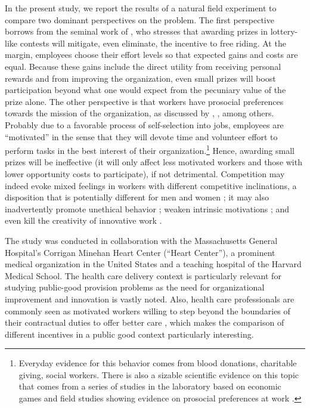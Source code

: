 \documentclass[11pt, titlepage]{article}
\begin{document}
In the present study, we report the results of a natural field
experiment to compare two dominant perspectives on the problem. The
first perspective borrows from the seminal work of
\citet{morgan2000financing}, who stresses that awarding prizes in
lottery-like contests will mitigate, even eliminate, the incentive to
free riding. At the margin, employees choose their effort levels so that
expected gains and costs are equal. Because these gains include the
direct utility from receiving personal rewards and from improving the
organization, even small prizes will boost participation beyond what one
would expect from the pecuniary value of the prize alone. The other
perspective is that workers have prosocial preferences towards the
mission of the organization, as discussed by
\citet{besley2005competition}, \citet{prendergast2007motivation},
\citet{delfgaauw2008incentives} among others. Probably due to a
favorable process of self-selection into jobs, employees are
``motivated'' in the sense that they will devote time and volunteer
effort to perform tasks in the best interest of their
organization.\footnote{Everyday evidence for this behavior comes from
  blood donations, charitable giving, social workers. There is also a
  sizable scientific evidence on this topic that comes from a series of
  studies in the laboratory based on economic games \citep[see][ for a
  review]{levitt2007laboratory} and field studies showing evidence on
  prosocial preferences at work
  \citep{bandiera2005social, dellavigna2016estimating}.} Hence, awarding
small prizes will be ineffective (it will only affect less motivated
workers and those with lower opportunity costs to participate), if not
detrimental. Competition may indeed evoke mixed feelings in workers with
different competitive inclinations, a disposition that is potentially
different for men and women \citep{croson2009gender}; it may also
inadvertently promote unethical behavior
\citep{lazear1989pay, charness2013dark}; weaken intrinsic motivations
\citep{reeve1996elements, frey1997not}; and even kill the creativity of
innovative work \citep{erat2015incentives}.

The study was conducted in collaboration with the Massachusetts General
Hospital's Corrigan Minehan Heart Center (``Heart Center''), a prominent
medical organization in the United States and a teaching hospital of the
Harvard Medical School. The health care delivery context is particularly
relevant for studying public-good provision problems as the need for
organizational improvement and innovation is vastly noted. Also, health
care professionals are commonly seen as motivated workers willing to
step beyond the boundaries of their contractual duties to offer better
care \citep{delfgaauw2005dedicated}, which makes the comparison of
different incentives in a public good context particularly interesting.
\end{document}
